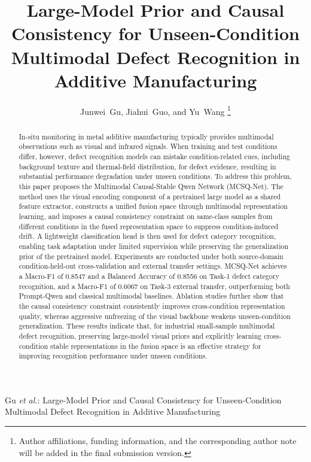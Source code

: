 \documentclass[journal]{IEEEtran}
\begin{document}
\title{Large-Model Prior and Causal Consistency for Unseen-Condition Multimodal Defect Recognition in Additive Manufacturing}

\author{Junwei~Gu, Jiahui~Guo, and Yu~Wang%
\thanks{Author affiliations, funding information, and the corresponding author note will be added in the final submission version.}}

%
{Gu \MakeLowercase{\textit{et al.}}: Large-Model Prior and Causal Consistency for Unseen-Condition Multimodal Defect Recognition in Additive Manufacturing}

\maketitle

\begin{abstract}
In-situ monitoring in metal additive manufacturing typically provides multimodal observations such as visual and infrared signals. When training and test conditions differ, however, defect recognition models can mistake condition-related cues, including background texture and thermal-field distribution, for defect evidence, resulting in substantial performance degradation under unseen conditions. To address this problem, this paper proposes the Multimodal Causal-Stable Qwen Network (MCSQ-Net). The method uses the visual encoding component of a pretrained large model as a shared feature extractor, constructs a unified fusion space through multimodal representation learning, and imposes a causal consistency constraint on same-class samples from different conditions in the fused representation space to suppress condition-induced drift. A lightweight classification head is then used for defect category recognition, enabling task adaptation under limited supervision while preserving the generalization prior of the pretrained model. Experiments are conducted under both source-domain condition-held-out cross-validation and external transfer settings. MCSQ-Net achieves a Macro-F1 of 0.8547 and a Balanced Accuracy of 0.8556 on Task-1 defect category recognition, and a Macro-F1 of 0.6067 on Task-3 external transfer, outperforming both Prompt-Qwen and classical multimodal baselines. Ablation studies further show that the causal consistency constraint consistently improves cross-condition representation quality, whereas aggressive unfreezing of the visual backbone weakens unseen-condition generalization. These results indicate that, for industrial small-sample multimodal defect recognition, preserving large-model visual priors and explicitly learning cross-condition stable representations in the fusion space is an effective strategy for improving recognition performance under unseen conditions.
\end{abstract}
\end{document}
